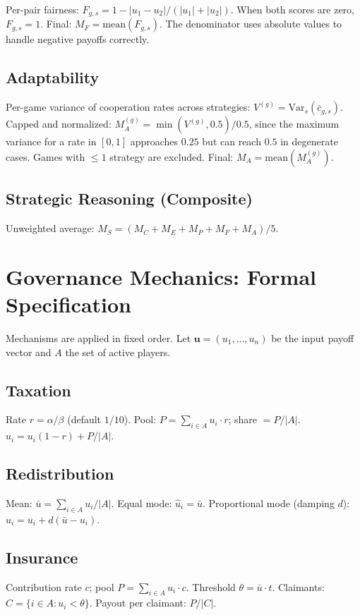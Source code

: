 Per-pair fairness: $F_{g,s} = 1 - |u_1 - u_2| / (|u_1| + |u_2|)$.
When both scores are zero, $F_{g,s} = 1$. Final:
$M_F = \text{mean}(F_{g,s})$. The denominator uses absolute values
to handle negative payoffs correctly.

\subsection{Adaptability}

Per-game variance of cooperation rates across strategies:
$V^{(g)} = \text{Var}_s(\bar{c}_{g,s})$. Capped and normalized:
$M_A^{(g)} = \min(V^{(g)}, 0.5) / 0.5$, since the maximum variance
for a rate in $[0,1]$ approaches $0.25$ but can reach $0.5$ in
degenerate cases. Games with $\leq 1$ strategy are excluded.
Final: $M_A = \text{mean}(M_A^{(g)})$.

\subsection{Strategic Reasoning (Composite)}

Unweighted average: $M_S = (M_C + M_E + M_P + M_F + M_A) / 5$.

\section{Governance Mechanics: Formal Specification}
\label{app:governance-formal}

Mechanisms are applied in fixed order. Let $\mathbf{u} = (u_1, \ldots, u_n)$
be the input payoff vector and $A$ the set of active players.

\subsection{Taxation}
Rate $r = \alpha/\beta$ (default $1/10$).
Pool: $P = \sum_{i \in A} u_i \cdot r$; share $= P/|A|$.
$\hat{u}_i = u_i(1-r) + P/|A|$.

\subsection{Redistribution}
Mean: $\bar{u} = \sum_{i \in A} u_i / |A|$.
Equal mode: $\hat{u}_i = \bar{u}$.
Proportional mode (damping $d$): $\hat{u}_i = u_i + d(\bar{u} - u_i)$.

\subsection{Insurance}
Contribution rate $c$; pool $P = \sum_{i \in A} u_i \cdot c$.
Threshold $\theta = \bar{u} \cdot t$. Claimants:
$C = \{i \in A : u_i < \theta\}$. Payout per claimant: $P/|C|$.

